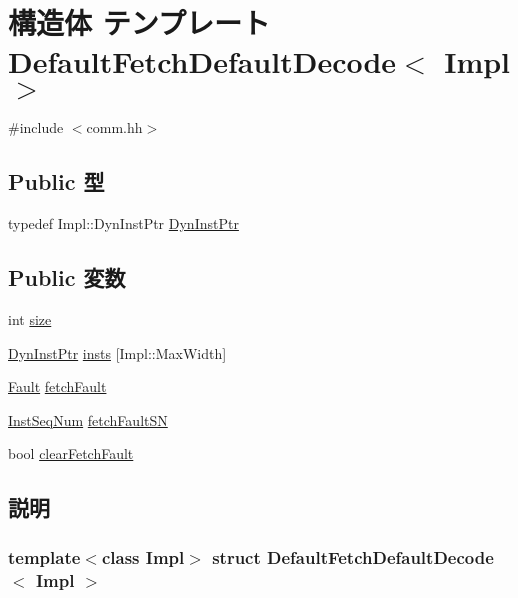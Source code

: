 \hypertarget{structDefaultFetchDefaultDecode}{
\section{構造体 テンプレート DefaultFetchDefaultDecode$<$ Impl $>$}
\label{structDefaultFetchDefaultDecode}
}


{\ttfamily \#include $<$comm.hh$>$}\subsection*{Public 型}
\begin{DoxyCompactItemize}
\item 
typedef Impl::DynInstPtr \hyperlink{structDefaultFetchDefaultDecode_a028ce10889c5f6450239d9e9a7347976}{DynInstPtr}
\end{DoxyCompactItemize}
\subsection*{Public 変数}
\begin{DoxyCompactItemize}
\item 
int \hyperlink{structDefaultFetchDefaultDecode_a439227feff9d7f55384e8780cfc2eb82}{size}
\item 
\hyperlink{structDefaultFetchDefaultDecode_a028ce10889c5f6450239d9e9a7347976}{DynInstPtr} \hyperlink{structDefaultFetchDefaultDecode_a84958be72c3a0ec66109a9483e6c0331}{insts} \mbox{[}Impl::MaxWidth\mbox{]}
\item 
\hyperlink{classRefCountingPtr}{Fault} \hyperlink{structDefaultFetchDefaultDecode_ac2f4c2fc84b40d9abd220e8bd21242c9}{fetchFault}
\item 
\hyperlink{inst__seq_8hh_a258d93d98edaedee089435c19ea2ea2e}{InstSeqNum} \hyperlink{structDefaultFetchDefaultDecode_a6076715dd3cff9cb36f4ec6fea7b7297}{fetchFaultSN}
\item 
bool \hyperlink{structDefaultFetchDefaultDecode_a856dd3fa4ffcbaf645463aabe1876781}{clearFetchFault}
\end{DoxyCompactItemize}


\subsection{説明}
\subsubsection*{template$<$class Impl$>$ struct DefaultFetchDefaultDecode$<$ Impl $>$}

